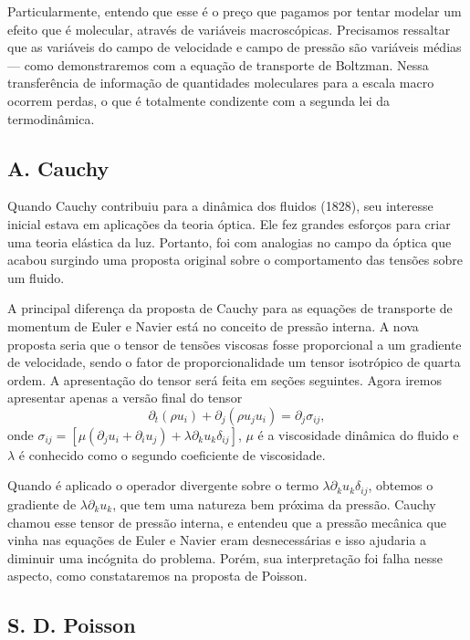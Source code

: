 Particularmente, entendo que esse é o preço que pagamos por tentar modelar um efeito que é molecular, através de variáveis macroscópicas. Precisamos ressaltar que as variáveis do campo de velocidade e campo de pressão são variáveis médias — como demonstraremos com a equação de transporte de Boltzman. Nessa transferência de informação de quantidades moleculares para a escala macro ocorrem perdas, o que é totalmente condizente com a segunda lei da termodinâmica.

\subsection{A. Cauchy}
Quando Cauchy contribuiu para a dinâmica dos fluidos (1828), seu interesse inicial estava em aplicações da teoria óptica. Ele fez grandes esforços para criar uma teoria elástica da luz. Portanto, foi com analogias no campo da óptica que acabou surgindo uma proposta original sobre o comportamento das tensões sobre um fluido.

A principal diferença da proposta de Cauchy para as equações de transporte de momentum de Euler e Navier está no conceito de pressão interna. A nova proposta seria que o tensor de tensões viscosas fosse proporcional a um gradiente de velocidade, sendo o fator de proporcionalidade um tensor isotrópico de quarta ordem. A apresentação do tensor será feita em seções seguintes. Agora iremos apresentar apenas a versão final do tensor
\begin{equation*}\label{NS_final}
\partial_{t}(\rho u_{i})+ \partial_{j} (\rho u_{j}u_{i})=  \partial_{j}\sigma_{ij},
\end{equation*}
onde $\sigma_{ij} = \left[\mu\left(\partial_{j}u_{i} + \partial_{i}u_{j}\right) + \lambda\partial_{k}u_{k}\delta_{ij}\right]$, $\mu$ é a viscosidade dinâmica do fluido e $\lambda$ é conhecido como o segundo coeficiente de viscosidade.

Quando é aplicado o operador divergente sobre o termo $\lambda\partial_{k}u_{k}\delta_{ij}$, obtemos o gradiente de $\lambda\partial_{k}u_{k}$, que tem uma natureza bem próxima da pressão. Cauchy chamou esse tensor de pressão interna, e entendeu que a pressão mecânica que vinha nas equações de Euler e Navier eram desnecessárias e isso ajudaria a diminuir uma incógnita do problema. Porém, sua interpretação foi falha nesse aspecto, como constataremos na proposta de Poisson.
\subsection{S. D. Poisson}

